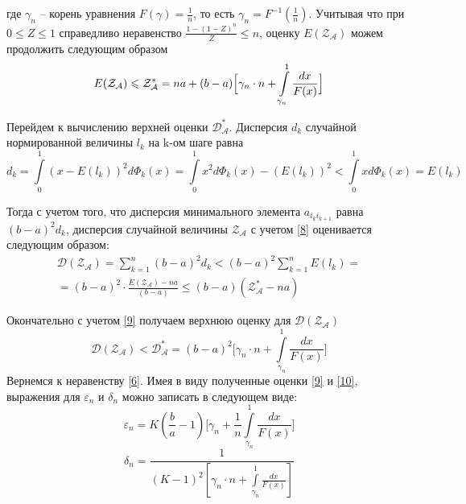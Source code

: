 \documentclass[a4paper, 14pt]{extarticle}
\numberwithin{equation}{section}
\begin{document}
где $\gamma_n$ -- корень уравнения $F(\gamma) = \frac{1}{n}$, то есть $\gamma_n = F^{-1}(\frac{1}{n})$. Учитывая что при $0 \leqslant Z \leqslant 1$ справедливо неравенство $\frac{1-(1-Z)^n}{Z} \leqslant n$, оценку $E( {\mathcal{Z_{A}}})$ можем продолжить следующим образом
\begin{equation}\label{9}
\text{$E(\text{$\mathcal{Z_{A}}$})$} \leqslant \text{$\mathcal{Z^*_{A}}$} = na+(b-a)\Big[\gamma_n \cdot n+ \int\limits_{\gamma_n}^1 \frac{dx}{F(x)} \Big]
\end{equation}

Перейдем к вычислению верхней оценки $\mathcal{D_A^{*}}$. Дисперсия $d_k$ случайной нормированной величины $l_k$ на k-ом шаге равна
\begin{equation*}
d_k=\int\limits_0^1 (x-E(l_k))^2 d \Phi_k(x) = \int\limits_0^1 x^2 d \Phi_k(x)- (E(l_k))^2 < \int\limits_0^1 x d \Phi_k(x) = E(l_k)
\end{equation*}

Тогда с учетом того, что дисперсия минимального элемента $a_{i_k i_{k+1}}$ равна $(b-a)^2 d_k$, дисперсия случайной величины ${\mathcal{Z_{A}}}$ с учетом \eqref{8} оценивается следующим образом:
\begin{equation*}
\begin{aligned}
\mathcal{D(\mathcal{Z_{A}})} = \sum_{k=1}^n (b-a)^2 d_k < (b-a)^2 \sum_{k=1}^n E(l_k) =\\
= (b-a)^2 \cdot \frac{E(\mathcal{Z_{A}})-na}{(b-a)} \leqslant (b-a)(\mathcal{Z_{A}^*}-na)
\end{aligned}
\end{equation*}

Окончательно с учетом \eqref{9} получаем верхнюю оценку для $\mathcal{D(\mathcal{Z_{A}})}$
\begin{equation}\label{10}
\mathcal{D(\mathcal{Z_{A}})} < \mathcal{D_{A}^*} = (b-a)^2 \Big[\gamma_n\cdot n+\int\limits_{\gamma_n}^1 \frac{dx}{F(x)} \Big]
\end{equation}
Вернемся к неравенству \eqref{6}. Имея в виду полученные оценки \eqref{9} и \eqref{10}, выражения для $\varepsilon_n$ и $\delta_n$ можно записать в следующем виде: 
\begin{equation*}
\varepsilon_n = K(\frac{b}{a}-1) \Big[\gamma_n + \frac{1}{n} \int\limits_{\gamma_n}^1 \frac{dx}{F(x)} \Big]
\end{equation*}
\begin{equation*}
\delta_n = \frac{1}{(K-1)^2 [\gamma_n \cdot n + \int\limits_{\gamma_n}^1 \frac{dx}{F(x)}]}
\end{equation*}
\end{document}
